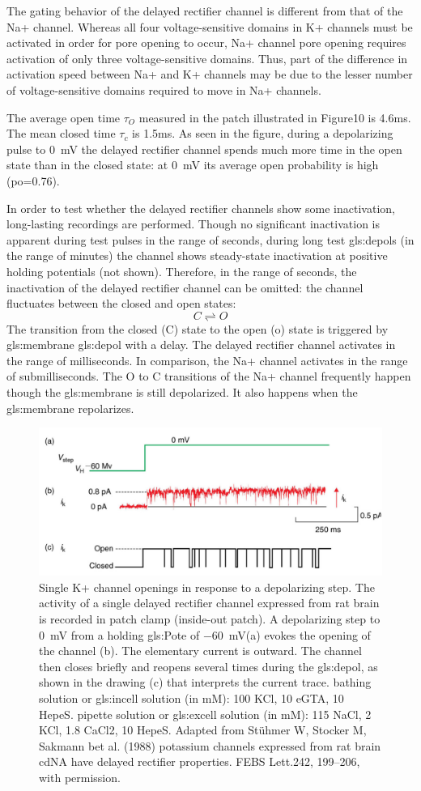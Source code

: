 \documentclass[class={.NoTouch/myProject}, crop=false]{standalone}
\begin{document}
The gating behavior of the delayed rectifier channel is different from that of the Na+ channel.  Whereas all four voltage-sensitive domains in K+ channels must be activated in order for pore opening to occur, Na+ channel pore opening requires activation of only three voltage-sensitive domains. Thus, part of the difference in activation speed between Na+ and K+ channels may be due to the lesser number of voltage-sensitive domains required to move in Na+ channels.

The average open time \(\tau_O\) measured in the patch illustrated in Figure10 is 4.6ms. The mean closed time \(\tau_c\) is 1.5ms. As seen in the figure, during a depolarizing pulse to \qty{0}{\mV} the delayed rectifier channel spends much more time in the open state than in the closed state: at \qty{0}{\mV} its average open probability is high (po=0.76).

In order to test whether the delayed rectifier channels show some inactivation, long-lasting recordings are performed. Though no significant inactivation is apparent during test pulses in the range of seconds, during long test \glspl{gls:depol} (in the range of minutes) the channel shows steady-state inactivation at positive holding potentials (not shown). Therefore, in the range of seconds, the inactivation of the delayed rectifier channel can be omitted: the channel fluctuates between the closed and open states:
\[C\rightleftharpoons O\]
The transition from the closed (C) state to the open (o) state is triggered by \gls{gls:membrane} \gls{gls:depol} with a delay. The delayed rectifier channel activates in the range of milliseconds. In comparison, the Na+ channel activates in the range of submilliseconds. The O to C transitions of the Na+ channel frequently happen though the \gls{gls:membrane} is still depolarized. It also happens when the \gls{gls:membrane} repolarizes. 
  \begin{figure}[H]
      \centering
      \includegraphics[width=0.5\linewidth]{Pictures//Anakin/K+channel.png}
      \caption{Single K+ channel openings in response to a depolarizing step. The activity of a single delayed rectifier channel expressed from rat brain is recorded in patch clamp (inside-out patch). A depolarizing step to \qty{0}{\mV} from a holding \gls{gls:Pote} of \qty{-60}{\mV}(a) evokes the opening of the channel (b). The elementary current is outward. The channel then closes briefly and reopens several times during the \gls{gls:depol}, as shown in the drawing (c) that interprets the current trace. bathing solution or \gls{gls:incell} solution (in mM): 100 KCl, 10 eGTA, 10 HepeS. pipette solution or \gls{gls:excell} solution (in mM): 115 NaCl, 2 KCl, 1.8 CaCl2, 10 HepeS. Adapted from Stühmer W, Stocker M, Sakmann bet al. (1988) potassium channels expressed from rat brain cdNA have delayed rectifier properties. FEBS Lett.242, 199–206, with permission. }
      \label{fig:enter-label}
  \end{figure}
\end{document}
